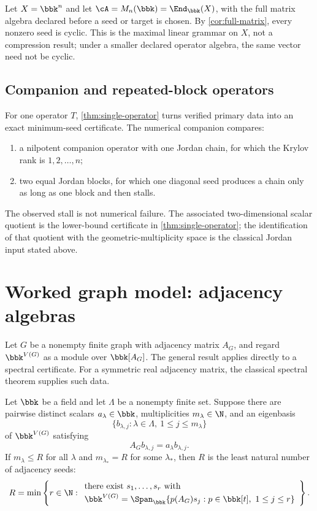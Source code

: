 Let $X=\bbk^n$ and let $\cA=M_n(\bbk)=\End_{\bbk}(X)$, with the full matrix algebra declared before a seed or target is chosen. By \cref{cor:full-matrix}, every nonzero seed is cyclic. This is the maximal linear grammar on $X$, not a compression result; under a smaller declared operator algebra, the same vector need not be cyclic.

\subsection{Companion and repeated-block operators}

For one operator $T$, \cref{thm:single-operator} turns verified primary data
into an exact minimum-seed certificate.  The numerical companion compares:
\begin{enumerate}[label=(\alph*)]
\item a nilpotent companion operator with one Jordan chain, for which the Krylov rank is $1,2,\ldots,n$;
\item two equal Jordan blocks, for which one diagonal seed produces a chain only as long as one block and then stalls.
\end{enumerate}

The observed stall is not numerical failure.  The associated
two-dimensional scalar quotient is the lower-bound certificate in
\cref{thm:single-operator}; the identification of that quotient with the
geometric-multiplicity space is the classical Jordan input stated above.

\section{Worked graph model: adjacency algebras}

Let $G$ be a nonempty finite graph with adjacency matrix $A_G$, and regard
$\bbk^{V(G)}$ as a module over $\bbk[A_G]$.  The general result applies directly to a spectral certificate. For a symmetric real adjacency matrix, the classical spectral theorem supplies such data.

\begin{corollary}
\label{cor:graph-rank}
Let $\bbk$ be a field and let $\Lambda$ be a nonempty finite set.  Suppose
there are pairwise distinct scalars $a_{\lambda}\in\bbk$, multiplicities
$m_{\lambda}\in\N$, and an eigenbasis
\[
\{b_{\lambda,j}:\lambda\in\Lambda,\ 1\le j\le m_{\lambda}\}
\]
of $\bbk^{V(G)}$ satisfying
\[
A_Gb_{\lambda,j}=a_{\lambda}b_{\lambda,j}.
\]
If $m_{\lambda}\le R$ for all $\lambda$ and
$m_{\lambda_*}=R$ for some $\lambda_*$, then $R$ is the least natural number
of adjacency seeds:
\[
{
R=\min\left\{r\in\N:
\begin{array}{l}
\text{there exist }s_1,\ldots,s_r\text{ with}\\[2pt]
\bbk^{V(G)}=\Span_{\bbk}
  \{p(A_G)s_j:p\in\bbk[t],\ 1\le j\le r\}
\end{array}
\right\}.
}
\]
\end{corollary}

